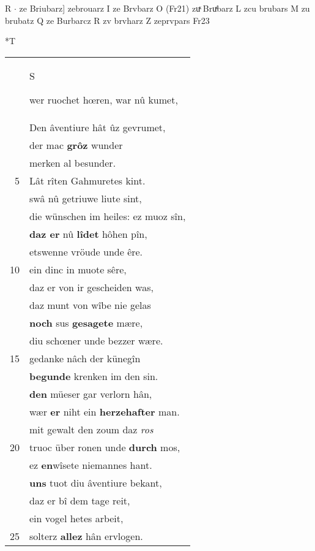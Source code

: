 \documentclass[8pt,a4paper,notitlepage]{article}
\begin{document}
\begin{table}[ht]
\begin{minipage}[t]{0.5\linewidth}
R  $\cdot$ ze Briubarz] zebrouarz I ze Brvbarz O (Fr21) zuͯ Bruͯbarz L zcu brubars M zu brubatz Q ze Burbarcz R zv brvharz Z zeprvpars Fr23 \newline
\end{minipage}
\hspace{0.5cm}
\begin{minipage}[t]{0.5\linewidth}
\small
\begin{center}*T
\end{center}
\begin{tabular}{rl}
 & \begin{large}S\end{large}wer ruochet hœren, war nû kumet,\\ 
 & Den âventiure hât ûz gevrumet,\\ 
 & der mac \textbf{grôz} wunder\\ 
 & merken al besunder.\\ 
5 & Lât rîten Gahmuretes kint.\\ 
 & swâ nû getriuwe liute sint,\\ 
 & die wünschen im heiles: ez muoz sîn,\\ 
 & \textbf{daz er} nû \textbf{lîdet} hôhen pîn,\\ 
 & etswenne vröude unde êre.\\ 
10 & ein dinc in muote sêre,\\ 
 & daz er von ir gescheiden was,\\ 
 & daz munt von wîbe nie gelas\\ 
 & \textbf{noch} sus \textbf{gesagete} mære,\\ 
 & diu schœner unde bezzer wære.\\ 
15 & gedanke nâch der künegîn\\ 
 & \textbf{begunde} krenken im den sin.\\ 
 & \textbf{den} müeser gar verlorn hân,\\ 
 & wær \textbf{er} niht ein \textbf{herzehafter} man.\\ 
 & mit gewalt den zoum daz \textit{ros}\\ 
20 & truoc über ronen unde \textbf{durch} mos,\\ 
 & ez \textbf{en}wîsete niemannes hant.\\ 
 & \textbf{uns} tuot diu âventiure bekant,\\ 
 & daz er bî dem tage reit,\\ 
 & ein vogel hetes arbeit,\\ 
25 & solterz \textbf{allez} hân ervlogen.\\ 

\end{tabular}
\end{minipage}
\end{table}
\end{document}
